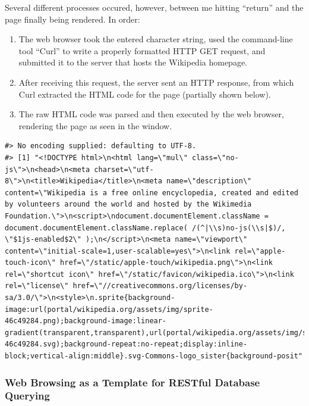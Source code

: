 \documentclass[]{book}
\begin{document}
Several different processes occured, however, between me hitting
``return'' and the page finally being rendered. In order:

\begin{enumerate}
\def\labelenumi{\arabic{enumi}.}
\item
  The web browser took the entered character string, used the
  command-line tool ``Curl'' to write a properly formatted HTTP GET
  request, and submitted it to the server that hosts the Wikipedia
  homepage.
\item
  After receiving this request, the server sent an HTTP response, from
  which Curl extracted the HTML code for the page (partially shown
  below).
\item
  The raw HTML code was parsed and then executed by the web browser,
  rendering the page as seen in the window.
\end{enumerate}

\begin{verbatim}
#> No encoding supplied: defaulting to UTF-8.
#> [1] "<!DOCTYPE html>\n<html lang=\"mul\" class=\"no-js\">\n<head>\n<meta charset=\"utf-8\">\n<title>Wikipedia</title>\n<meta name=\"description\" content=\"Wikipedia is a free online encyclopedia, created and edited by volunteers around the world and hosted by the Wikimedia Foundation.\">\n<script>\ndocument.documentElement.className = document.documentElement.className.replace( /(^|\\s)no-js(\\s|$)/, \"$1js-enabled$2\" );\n</script>\n<meta name=\"viewport\" content=\"initial-scale=1,user-scalable=yes\">\n<link rel=\"apple-touch-icon\" href=\"/static/apple-touch/wikipedia.png\">\n<link rel=\"shortcut icon\" href=\"/static/favicon/wikipedia.ico\">\n<link rel=\"license\" href=\"//creativecommons.org/licenses/by-sa/3.0/\">\n<style>\n.sprite{background-image:url(portal/wikipedia.org/assets/img/sprite-46c49284.png);background-image:linear-gradient(transparent,transparent),url(portal/wikipedia.org/assets/img/sprite-46c49284.svg);background-repeat:no-repeat;display:inline-block;vertical-align:middle}.svg-Commons-logo_sister{background-posit"
\end{verbatim}

\subsubsection*{Web Browsing as a Template for RESTful Database
Querying}\label{web-browsing-as-a-template-for-restful-database-querying}
\end{document}
